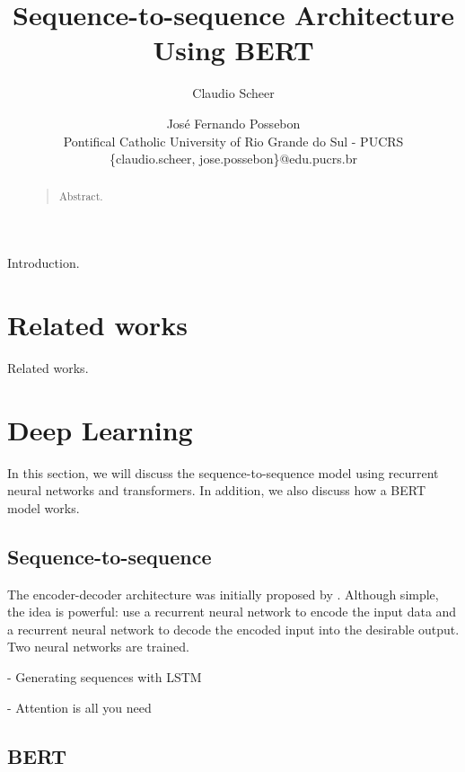 \documentclass[letterpaper]{article}
\begin{document}
%
\title{Sequence-to-sequence Architecture\\Using BERT}
\author{Claudio Scheer \and Jos\'e Fernando Possebon\\
    Pontifical Catholic University of Rio Grande do Sul - PUCRS\\
    \{claudio.scheer, jose.possebon\}@edu.pucrs.br
}

\maketitle

\begin{abstract}
    \begin{quote}
        Abstract.
    \end{quote}
\end{abstract}

\noindent Introduction.


\section{Related works}
Related works.


\section{Deep Learning}

In this section, we will discuss the sequence-to-sequence model using recurrent neural networks and transformers. In addition, we also discuss how a BERT model works.

\subsection{Sequence-to-sequence}

The encoder-decoder architecture was initially proposed by \cite{DBLP:journals/corr/ChoMGBSB14}. Although simple, the idea is powerful: use a recurrent neural network to encode the input data and a recurrent neural network to decode the encoded input into the desirable output. Two neural networks are trained.

\cite{DBLP:journals/corr/Graves13} - Generating sequences with LSTM

 - Attention is all you need


\subsection{BERT}
\end{document}
